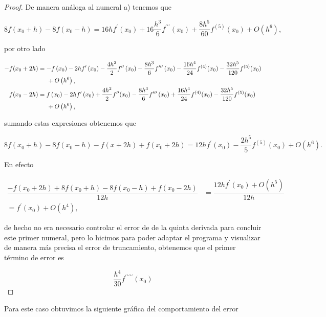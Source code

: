 \documentclass[12pt, a4paper]{article}%
\begin{document}
\begin{proof}
    De manera análoga al numeral a) tenemos que
    
$$
8f\left(x_0+h\right)-8f\left(x_0-h\right)=16 h f^{\prime}\left(x_0\right)+16\frac{h^3}{6} f^{\prime \prime \prime}\left(x_0\right)+ \dfrac{8h^5}{60}f^{(5)}(x_0)+O(h^6),
$$

por otro lado

$$\begin{aligned}
 -f(x_0+2 h)&=-f\left(x_0\right)-2h f^{\prime}\left(x_0\right)-\frac{4 h^2}{2} f^{\prime \prime}\left(x_0\right)-\frac{8 h^3}{6} f^{\prime\prime \prime}\left(x_0\right)-\dfrac{16h^4}{24}f^{(4)}(x_0)-\dfrac{32h^5}{120}f^{(5)}(x_0)\\
&\hspace{0.5cm}+O\left(h^6\right),\\
f(x_0-2 h)&=f\left(x_0\right)-2 h f^{\prime}\left(x_0\right)+\frac{4 h^2}{2}f^{\prime\prime}(x_0)-\frac{8 h^3}{6} f^{\prime \prime \prime}\left(x_0\right)+\dfrac{16h^4}{24}f^{(4)}(x_0)-\dfrac{32h^5}{120}f^{(5)}(x_0)\\
&\hspace{0.5cm}+O\left(h^6\right),
\end{aligned}
$$

sumando estas expresiones obtenemos que 

$$8f\left(x_0+h\right)-8f\left(x_0-h\right)-f(x+2h)+f(x_0+2h)=12hf^{\prime}(x_0)-\dfrac{2h^5}{5}f^{(5)}(x_0)+O(h^6).$$

En efecto 

\begin{align*}
     \dfrac{-f(x_0 + 2h) + 8f(x_0 + h) - 8f(x_0 - h) + f(x_0 - 2h)}{12h}&=\dfrac{12hf^{\prime}(x_0)+O(h^5)}{12h}\\
     =f^{\prime}(x_0)+O(h^4),
\end{align*}

de hecho no era necesario controlar el error de de la quinta derivada para concluir este primer numeral, pero lo hicimos para poder adaptar el programa y visualizar de manera más precisa el error de truncamiento, obtenemos que el primer término de error es

$$\dfrac{h^4}{30}f^{\prime\prime\prime\prime\prime}(x_0)$$
\end{proof}

Para este caso obtuvimos la siguiente gráfica del comportamiento del error
\end{document}
